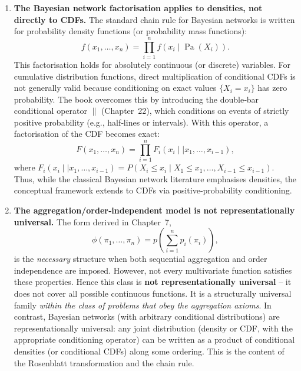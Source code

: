 \begin{enumerate}
    \item \textbf{The Bayesian network factorisation applies to densities, not directly to CDFs.}
    The standard chain rule for Bayesian networks is written for probability density functions (or probability mass functions):
    \[
    f(x_1,\ldots,x_n) = \prod_{i=1}^n f(x_i \mid \operatorname{Pa}(X_i)).
    \]
    This factorisation holds for absolutely continuous (or discrete) variables. For cumulative distribution functions, direct multiplication of conditional CDFs is not generally valid because conditioning on exact values $\{X_i = x_i\}$ has zero probability. The book overcomes this by introducing the double‑bar conditional operator $\|$ (Chapter~22), which conditions on events of strictly positive probability (e.g., half‑lines or intervals). With this operator, a factorisation of the CDF becomes exact:
    \[
    F(x_1,\ldots,x_n) = \prod_{i=1}^n F_i(x_i \mid\mid x_1,\ldots,x_{i-1}),
    \]
    where $F_i(x_i \mid\mid x_1,\ldots,x_{i-1}) = P(X_i \le x_i \mid X_1 \le x_1, \ldots, X_{i-1} \le x_{i-1})$. Thus, while the classical Bayesian network literature emphasises densities, the conceptual framework extends to CDFs via positive‑probability conditioning.

    \item \textbf{The aggregation/order‑independent model is not representationally universal.}
    The form derived in Chapter~7,
    \[
    \phi(\pi_1,\ldots,\pi_n) = p\!\left(\sum_{i=1}^n p_i(\pi_i)\right),
    \]
    is the \emph{necessary} structure when both sequential aggregation and order independence are imposed. However, not every multivariate function satisfies these properties. Hence this class is \textbf{not representationally universal} – it does not cover all possible continuous functions. It is a structurally universal family \emph{within the class of problems that obey the aggregation axioms}. In contrast, Bayesian networks (with arbitrary conditional distributions) are representationally universal: any joint distribution (density or CDF, with the appropriate conditioning operator) can be written as a product of conditional densities (or conditional CDFs) along some ordering. This is the content of the Rosenblatt transformation and the chain rule.


\end{enumerate}
